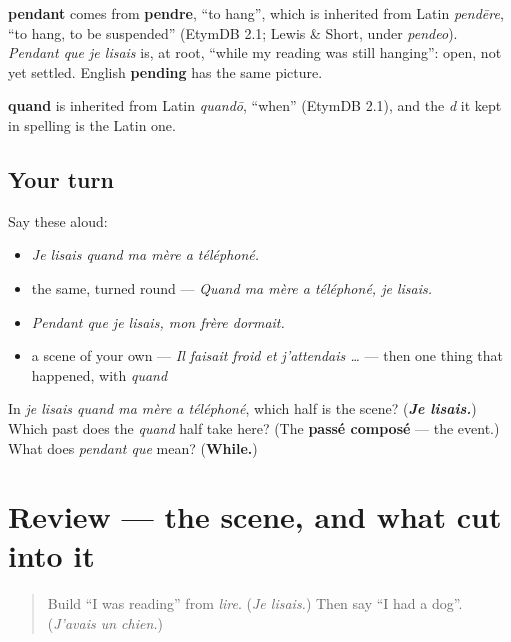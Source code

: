 \begin{cousinweb}
\textbf{pendant} comes from \textbf{pendre}, \textquotedblleft{}to hang\textquotedblright{}, which is inherited from Latin \emph{pendēre}, \textquotedblleft{}to hang, to be suspended\textquotedblright{} (EtymDB 2.1; Lewis \& Short, under \emph{pendeo}). \emph{Pendant que je lisais} is, at root, \textquotedblleft{}while my reading was still hanging\textquotedblright{}: open, not yet settled. English \textbf{pending} has the same picture.

\textbf{quand} is inherited from Latin \emph{quandō}, \textquotedblleft{}when\textquotedblright{} (EtymDB 2.1), and the \emph{d} it kept in spelling is the Latin one.
\end{cousinweb}

\subsection*{Your turn}
Say these aloud:

\begin{itemize}
\raggedright
  \item \emph{Je lisais quand ma mère a téléphoné.}
  \item the same, turned round — \emph{Quand ma mère a téléphoné, je lisais.}
  \item \emph{Pendant que je lisais, mon frère dormait.}
  \item a scene of your own — \emph{Il faisait froid et j'attendais …} — then one thing that happened, with \emph{quand}
\end{itemize}

\begin{tcolorbox}[breakable,colback=teal!4,colframe=teal!35!black,title={Before you move on}]
In \emph{je lisais quand ma mère a téléphoné}, which half is the scene? (\emph{\textbf{Je lisais.}}) Which past does the \emph{quand} half take here? (The \textbf{passé composé} — the event.) What does \emph{pendant que} mean? (\textbf{While.})
\end{tcolorbox}
\section[(review)]{Review — the scene, and what cut into it}

\label{lesson:FR-C258-revision-quand}



\begin{quote}
Build \textquotedblleft{}I was reading\textquotedblright{} from \emph{lire}. (\emph{Je lisais.}) Then say \textquotedblleft{}I had a dog\textquotedblright{}. (\emph{J'avais un chien.})
\end{quote}

